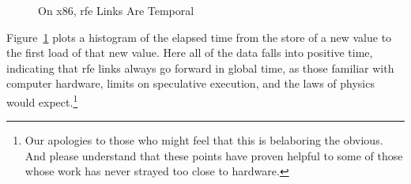 \documentclass[10]{article}
\begin{document}
\begin{figure}[tb]
\begin{center}
\caption{On x86, rfe Links Are Temporal}
\label{fig:On x86, rfe Links Are Temporal}
\end{center}
\end{figure}

Figure~\ref{fig:On x86, rfe Links Are Temporal}
plots a histogram of the elapsed time from the store of a new value
to the first load of that new value.
Here all of the data falls into positive time, indicating
that rfe links always go forward in global time, as those familiar with
computer hardware, limits on speculative execution, and the laws of
physics would expect.\footnote{
	Our apologies to those who might feel that this is belaboring
	the obvious.
	And please understand that these points have proven helpful to
	some of those whose work has never strayed too close to
	hardware.}
\end{document}
